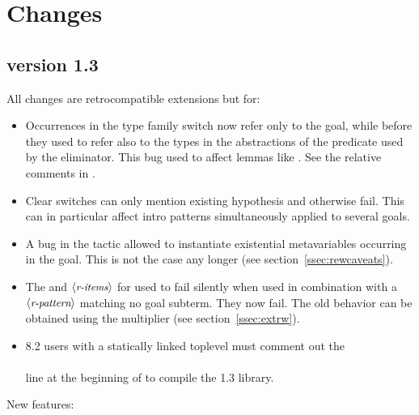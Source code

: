 \section{Changes}

\subsection{\ssr{} version 1.3}
All changes are retrocompatible extensions but for:
\begin{itemize}
\item Occurrences in the type family switch now refer only to the goal, while
      before they used to refer also to the types in the abstractions of the
      predicate used by the eliminator. This bug used to affect lemmas like
      . See the relative comments in .
\item Clear switches can only mention existing hypothesis and
      otherwise fail. This can in particular affect intro patterns
      simultaneously applied to several goals.
\item A bug in the  tactic allowed to
      instantiate existential metavariables occurring in the goal.
      This is not the case any longer (see section~\ref{ssec:rewcaveats}).
\item The  and  $\langle\mbox{\itshape\rmfamily\small r-items}\rangle$ for  used to
      fail silently when used in combination with a $\langle\mbox{\itshape\rmfamily\small r-pattern}\rangle$ matching no
      goal subterm. They now fail. The old behavior can be obtained using
      the  multiplier (see section~\ref{ssec:extrw}).
\item \Coq{} 8.2 users with a statically linked toplevel must comment out the\\
      \\
      line at the beginning of  to compile the 1.3 library.
\end{itemize}
New features:
